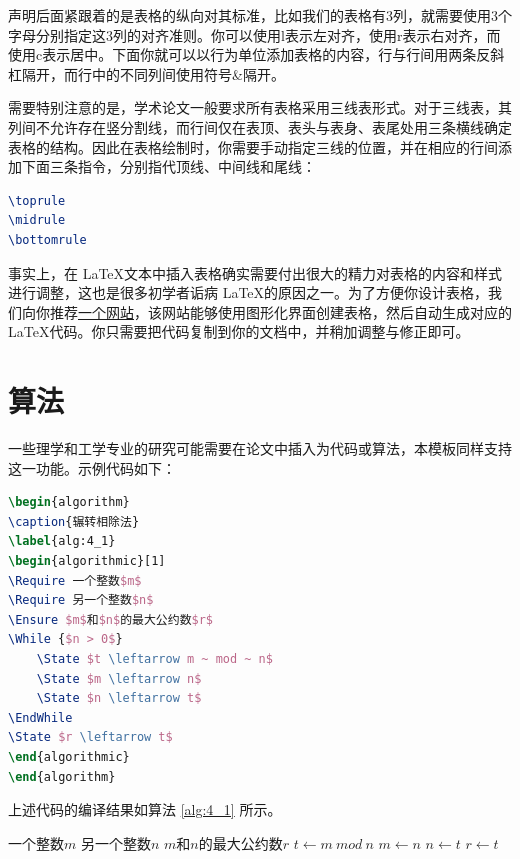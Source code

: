 声明后面紧跟着的是表格的纵向对其标准，比如我们的表格有3列，就需要使用3个字母分别指定这3列的对齐准则。你可以使用{\codefont l}表示左对齐，使用{\codefont r}表示右对齐，而使用{\codefont c}表示居中。下面你就可以以行为单位添加表格的内容，行与行间用两条反斜杠隔开，而行中的不同列间使用符号\&隔开。

需要特别注意的是，学术论文一般要求所有表格采用三线表形式。对于三线表，其列间不允许存在竖分割线，而行间仅在表顶、表头与表身、表尾处用三条横线确定表格的结构。因此在表格绘制时，你需要手动指定三线的位置，并在相应的行间添加下面三条指令，分别指代顶线、中间线和尾线：

\begin{tcolorbox}
\begin{lstlisting}[language=TeX]
\toprule
\midrule
\bottomrule
\end{lstlisting}
\end{tcolorbox}

事实上，在 \LaTeX 文本中插入表格确实需要付出很大的精力对表格的内容和样式进行调整，这也是很多初学者诟病 \LaTeX 的原因之一。为了方便你设计表格，我们向你推荐\href{http://www.tablesgenerator.com/}{一个网站}，该网站能够使用图形化界面创建表格，然后自动生成对应的 \LaTeX 代码。你只需要把代码复制到你的文档中，并稍加调整与修正即可。

\section{算法}

一些理学和工学专业的研究可能需要在论文中插入为代码或算法，本模板同样支持这一功能。示例代码如下：

\begin{tcolorbox}
\begin{lstlisting}[language=TeX]
\begin{algorithm}
\caption{辗转相除法}
\label{alg:4_1}
\begin{algorithmic}[1]
\Require 一个整数$m$
\Require 另一个整数$n$
\Ensure $m$和$n$的最大公约数$r$
\While {$n > 0$}
    \State $t \leftarrow m ~ mod ~ n$
    \State $m \leftarrow n$
    \State $n \leftarrow t$
\EndWhile
\State $r \leftarrow t$
\end{algorithmic}
\end{algorithm}
\end{lstlisting}
\end{tcolorbox}

\noindent 上述代码的编译结果如算法 \ref{alg:4_1} 所示。

\begin{algorithm}
\caption{辗转相除法}
\label{alg:4_1}
\begin{algorithmic}[1]
\Require 一个整数$m$
\Require 另一个整数$n$
\Ensure $m$和$n$的最大公约数$r$
    \State $t \leftarrow m ~ mod ~ n$
    \State $m \leftarrow n$
    \State $n \leftarrow t$
\EndWhile
\State $r \leftarrow t$
\end{algorithmic}
\end{algorithm}

